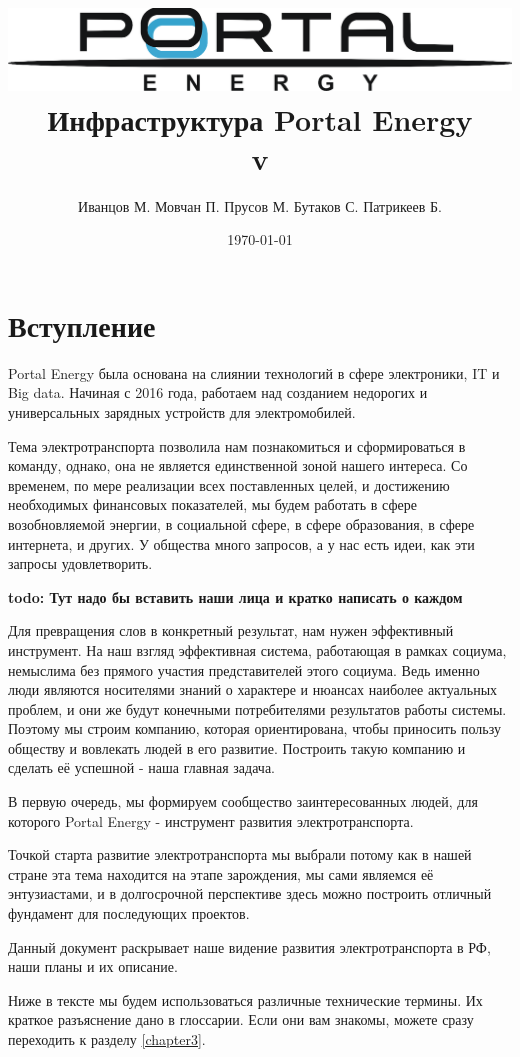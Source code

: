 \documentclass[a4paper,12pt]{report}
\title{\includegraphics[width=14cm]{logo}\\[2cm]Инфраструктура Portal Energy \\\normalsize v\versionnumber}
\author{Иванцов М. Мовчан П. Прусов М. Бутаков С. Патрикеев Б.}
\date{\today}
\begin{document}
%
\maketitle
\tableofcontents
\clearpage


\chapter{Вступление}

Portal Energy была основана на слиянии технологий в сфере электроники, IT и Big data. Начиная с 2016 года, работаем над созданием недорогих и универсальных зарядных устройств для электромобилей. 

Тема электротранспорта позволила нам познакомиться и сформироваться в команду, однако, она не является единственной зоной нашего интереса. Со временем, по мере реализации всех поставленных целей, и достижению необходимых финансовых показателей, мы будем работать в сфере возобновляемой энергии, в социальной сфере, в сфере образования, в сфере интернета, и других. У общества много запросов, а у нас есть идеи, как эти запросы удовлетворить. 

\textbf{todo: Тут надо бы вставить наши лица и кратко написать о каждом}

Для превращения слов в конкретный результат, нам нужен эффективный инструмент. На наш взгляд эффективная система, работающая в рамках социума, немыслима без прямого участия представителей этого социума. Ведь именно люди являются носителями знаний о характере и нюансах наиболее актуальных проблем, и они же будут конечными потребителями результатов работы системы. Поэтому мы строим компанию, которая ориентирована, чтобы приносить пользу обществу и вовлекать людей в его развитие. Построить такую компанию и сделать её успешной - наша главная задача. 

В первую очередь, мы формируем сообщество заинтересованных людей, для которого Portal Energy -  инструмент развития электротранспорта.

Точкой старта развитие электротранспорта мы выбрали потому как в нашей стране эта тема находится на этапе зарождения, мы сами являемся её энтузиастами, и в долгосрочной перспективе здесь можно построить отличный фундамент для последующих проектов. 

Данный документ раскрывает наше видение развития электротранспорта в РФ, наши планы и их описание.

Ниже в тексте мы будем использоваться различные технические термины. Их краткое разъяснение дано в глоссарии. Если они вам знакомы, можете сразу переходить к разделу \ref{chapter3}.
\end{document}
